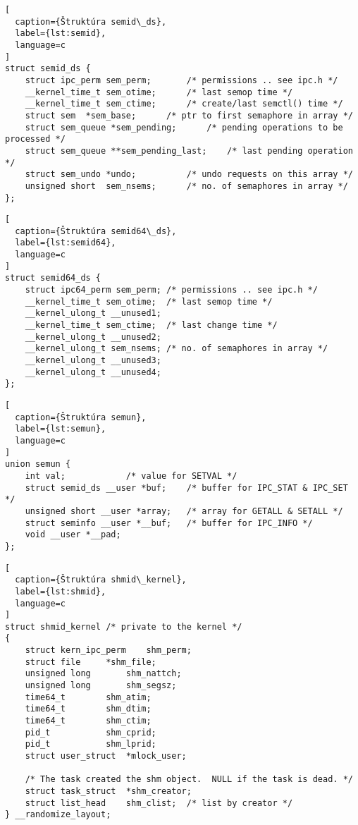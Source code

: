 \begin{lstlisting}[
  caption={Štruktúra semid\_ds},
  label={lst:semid},
  language=c
]
struct semid_ds {
	struct ipc_perm	sem_perm;		/* permissions .. see ipc.h */
	__kernel_time_t	sem_otime;		/* last semop time */
	__kernel_time_t	sem_ctime;		/* create/last semctl() time */
	struct sem	*sem_base;		/* ptr to first semaphore in array */
	struct sem_queue *sem_pending;		/* pending operations to be processed */
	struct sem_queue **sem_pending_last;	/* last pending operation */
	struct sem_undo	*undo;			/* undo requests on this array */
	unsigned short	sem_nsems;		/* no. of semaphores in array */
};
\end{lstlisting}
\begin{lstlisting}[
  caption={Štruktúra semid64\_ds},
  label={lst:semid64},
  language=c
]
struct semid64_ds {
	struct ipc64_perm sem_perm;	/* permissions .. see ipc.h */
	__kernel_time_t	sem_otime;	/* last semop time */
	__kernel_ulong_t __unused1;
	__kernel_time_t	sem_ctime;	/* last change time */
	__kernel_ulong_t __unused2;
	__kernel_ulong_t sem_nsems;	/* no. of semaphores in array */
	__kernel_ulong_t __unused3;
	__kernel_ulong_t __unused4;
};
\end{lstlisting}
\begin{lstlisting}[
  caption={Štruktúra semun},
  label={lst:semun},
  language=c
]
union semun {
	int val;			/* value for SETVAL */
	struct semid_ds __user *buf;	/* buffer for IPC_STAT & IPC_SET */
	unsigned short __user *array;	/* array for GETALL & SETALL */
	struct seminfo __user *__buf;	/* buffer for IPC_INFO */
	void __user *__pad;
};
\end{lstlisting}
\begin{lstlisting}[
  caption={Štruktúra shmid\_kernel},
  label={lst:shmid},
  language=c
]
struct shmid_kernel /* private to the kernel */
{	
	struct kern_ipc_perm	shm_perm;
	struct file		*shm_file;
	unsigned long		shm_nattch;
	unsigned long		shm_segsz;
	time64_t		shm_atim;
	time64_t		shm_dtim;
	time64_t		shm_ctim;
	pid_t			shm_cprid;
	pid_t			shm_lprid;
	struct user_struct	*mlock_user;

	/* The task created the shm object.  NULL if the task is dead. */
	struct task_struct	*shm_creator;
	struct list_head	shm_clist;	/* list by creator */
} __randomize_layout;
\end{lstlisting}

